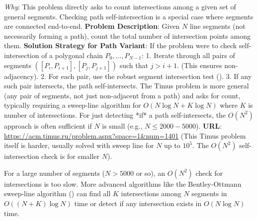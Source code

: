 \begin{problemexample}
\label{probex:A.4.3.timus_segments}
\textit{Why}: This problem directly asks to count intersections among a given set of general segments. Checking path self-intersection is a special case where segments are connected end-to-end.
\textbf{Problem Description}: Given $N$ line segments (not necessarily forming a path), count the total number of intersection points among them.
\textbf{Solution Strategy for Path Variant}:
If the problem were to check self-intersection of a polygonal chain $P_0, \dots, P_{N-1}$:
1. Iterate through all pairs of segments $([P_i, P_{i+1}], [P_j, P_{j+1}])$ such that $j > i+1$. (This ensures non-adjacency).
2. For each pair, use the robust segment intersection test ().
3. If any such pair intersects, the path self-intersects.
The Timus problem is more general (any pair of segments, not just non-adjacent from a path) and asks for count, typically requiring a sweep-line algorithm for $O(N \log N + K \log N)$ where $K$ is number of intersections. For just detecting *if* a path self-intersects, the $O(N^2)$ approach is often sufficient if $N$ is small (e.g., $N \le 2000-5000$).
\textbf{URL}: \url{https://acm.timus.ru/problem.aspx?space=1&num=1401} (This Timus problem itself is harder, usually solved with sweep line for $N$ up to $10^5$. The $O(N^2)$ self-intersection check is for smaller $N$).
\end{problemexample}

\begin{insight}
\label{insight:A.4.3.sweep_line_for_large_N}
For a large number of segments ($N > 5000$ or so), an $O(N^2)$ check for intersections is too slow. More advanced algorithms like the Bentley-Ottmann sweep-line algorithm () can find all $K$ intersections among $N$ segments in $O((N+K)\log N)$ time or detect if any intersection exists in $O(N \log N)$ time.
\end{insight}